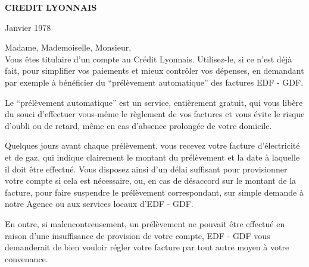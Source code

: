 \begin{center}\textsf{\textbf{CREDIT LYONNAIS}}\end{center}

\begin{flushright}Janvier 1978\\\end{flushright}

\noindent Madame, Mademoiselle, Monsieur,\\

Vous êtes titulaire d'un compte au Crédit Lyonnais. Utilisez-le, si ce n'est déjà fait, pour simplifier vos paiements et mieux contrôler vos dépenses, en demandant par exemple à bénéficier du ``prélèvement automatique'' des factures EDF - GDF.

Le ``prélèvement automatique'' est un service, entièrement gratuit, qui vous libère du souci d'effectuer vous-même le règlement de vos factures et vous évite le risque d'oubli ou de retard, même en cas d'absence prolongée de votre domicile.

Quelques jours avant chaque prélèvement, vous recevez votre facture d'électricité et de gaz, qui indique clairement le montant du prélèvement et la date à laquelle il doit être effectué. Vous disposez ainsi d'un délai suffisant pour provisionner votre compte si cela est nécessaire, ou, en cas de désaccord sur le montant de la facture, pour faire suspendre le prélèvement correspondant, sur simple demande à notre Agence ou aux services locaux d'EDF - GDF.

En outre, si malencontreusement, un prélèvement ne pouvait être effectué en raison d'une insuffisance de provision de votre compte, EDF - GDF vous demanderait de bien vouloir régler votre facture par tout autre moyen à votre convenance.

